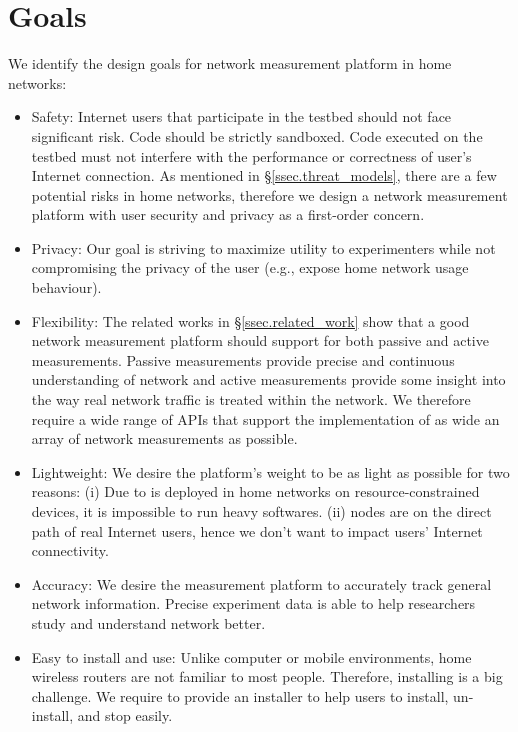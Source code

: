 \section{Goals}
\label{ssec.goals}
We identify the design goals for network measurement platform in home networks:
\begin{itemize}
\item Safety: Internet users that participate in the testbed should not face significant risk. Code should be strictly sandboxed. Code executed on the testbed must not interfere with the performance or correctness of user's Internet connection. As mentioned in \S{\ref{ssec.threat_models}}, there are a few potential risks in home networks, therefore we design a network measurement platform with user security and privacy as a first-order concern.

\item Privacy: Our goal is striving to maximize utility to experimenters while not compromising the privacy of the user (e.g., expose home network usage behaviour).

\item Flexibility: The related works in \S{\ref{ssec.related_work}} show that a good network measurement platform should support for both passive and active measurements. Passive measurements provide precise and continuous understanding of network and active measurements provide some insight into the way real network traffic is treated within the network. We therefore require a wide range of APIs that support the implementation of as wide an array of network measurements as possible.

\item Lightweight: We desire the platform's weight to be as light as possible for two reasons: (i) Due to \sysname is deployed in home networks on resource-constrained devices, it is impossible to run heavy softwares. (ii) \sysname nodes are on the direct path of real Internet users, hence we don't want to impact users' Internet connectivity.

\item Accuracy: We desire the measurement platform to accurately track 
general network information. Precise experiment data is able to help researchers study and understand network better.

\item Easy to install and use: Unlike computer or mobile environments, home wireless routers are not familiar to most people. Therefore, installing is a big challenge. We require to provide an installer to help users to install, un-install, and stop easily.
\end{itemize}

